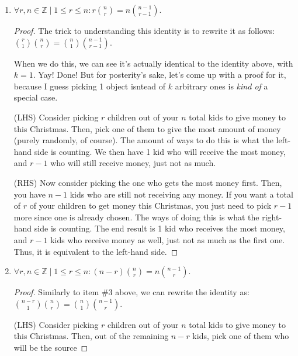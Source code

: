 \documentclass{article}
\begin{document}
\begin{enumerate}
\begin{proof}
        remaining $n-k$, since $k$ of them were already chosen. The ways of doing this are what the right-hand side is counting. The end result is still $k$ students in the first team,
        and $r-k$ students without a team but still participating. Thus, it is equivalent to the left-hand side. 
    \end{proof} 
    \item $\displaystyle \forall r,n \in \mathbb{Z} \mid 1 \leq r \leq n: r \binom{n}{r} = n \binom{n-1}{r-1}$.\begin{proof} 
        The trick to understanding this identity is to rewrite it as follows: $\displaystyle \binom{r}{1} \binom{n}{r} = \binom{n}{1} \binom{n-1}{r-1}$.\par 
        When we do this, we can see it's actually identical to the identity above, with $k=1$. Yay! Done! But for posterity's sake, let's come up with a proof for it, because 
        I guess picking 1 object isntead of $k$ arbitrary ones is \textit{kind of} a special case.\par 
        (LHS) Consider picking $r$ children out of your $n$ total kids to give money to this Christmas. Then, pick one of them to give the most amount of money (purely randomly, of course). The amount 
        of ways to do this is what the left-hand side is counting. We then have 1 kid who will receive the most money, and $r-1$ who will still receive money, just not as much.\par 
        (RHS) Now consider picking the one who gets the most money first. Then, you have $n-1$ kids who are still not receiving any money. If you want a total of $r$ of your children to get money this Christmas, 
        you just need to pick $r-1$ more since one is already chosen. The ways of doing this is what the right-hand side is counting. The end result is 1 kid who receives the most money, and $r-1$ kids who receive money 
        as well, just not as much as the first one. Thus, it is equivalent to the left-hand side. 
    \end{proof} 
    \item $\displaystyle \forall r,n \in \mathbb{Z} \mid 1 \leq r \leq n: (n-r) \binom{n}{r} = n \binom{n-1}{r}$.\begin{proof} 
        Similarly to item \#3 above, we can rewrite the identity as:  $\displaystyle \binom{n-r}{1} \binom{n}{r} = \binom{n}{1} \binom{n-1}{r}$.\par 
        (LHS) Consider picking $r$ children out of your $n$ total kids to give money to this Christmas. Then, out of the remaining $n-r$ kids, pick one of them who will be the source 

\end{proof}
\end{enumerate}
\end{document}
